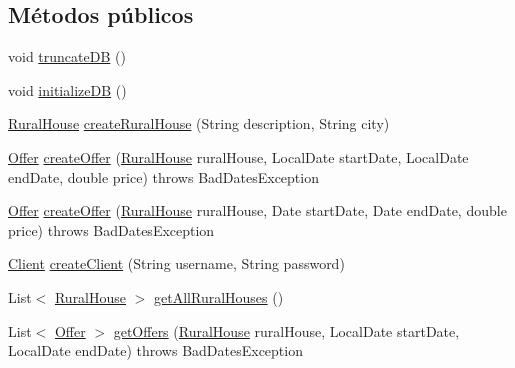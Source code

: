 \subsection*{Métodos públicos}
\begin{DoxyCompactItemize}
\item 
void \mbox{\hyperlink{interfacecom_1_1ruralhousejsf_1_1data_access_1_1_hibernate_data_access_interface_a181eb91e600e57fe36301128022f535d}{truncate\+DB}} ()
\item 
void \mbox{\hyperlink{interfacecom_1_1ruralhousejsf_1_1data_access_1_1_hibernate_data_access_interface_acab426a4933f3510c317816c136cec0b}{initialize\+DB}} ()
\item 
\mbox{\hyperlink{classcom_1_1ruralhousejsf_1_1domain_1_1_rural_house}{Rural\+House}} \mbox{\hyperlink{interfacecom_1_1ruralhousejsf_1_1data_access_1_1_hibernate_data_access_interface_a4c8bc4e3b076f4fc75efb878cc2c1c21}{create\+Rural\+House}} (String description, String city)
\item 
\mbox{\hyperlink{classcom_1_1ruralhousejsf_1_1domain_1_1_offer}{Offer}} \mbox{\hyperlink{interfacecom_1_1ruralhousejsf_1_1data_access_1_1_hibernate_data_access_interface_a0fe06262f78319a1fd4c2fd4e9534db8}{create\+Offer}} (\mbox{\hyperlink{classcom_1_1ruralhousejsf_1_1domain_1_1_rural_house}{Rural\+House}} rural\+House, Local\+Date start\+Date, Local\+Date end\+Date, double price)  throws Bad\+Dates\+Exception
\item 
\mbox{\hyperlink{classcom_1_1ruralhousejsf_1_1domain_1_1_offer}{Offer}} \mbox{\hyperlink{interfacecom_1_1ruralhousejsf_1_1data_access_1_1_hibernate_data_access_interface_a31f9cb8a3c8f0b42dee19b03f052cd62}{create\+Offer}} (\mbox{\hyperlink{classcom_1_1ruralhousejsf_1_1domain_1_1_rural_house}{Rural\+House}} rural\+House, Date start\+Date, Date end\+Date, double price)  throws Bad\+Dates\+Exception
\item 
\mbox{\hyperlink{classcom_1_1ruralhousejsf_1_1domain_1_1_client}{Client}} \mbox{\hyperlink{interfacecom_1_1ruralhousejsf_1_1data_access_1_1_hibernate_data_access_interface_a4671ad8ff75ef8a9195974dbdcd95e7f}{create\+Client}} (String username, String password)
\item 
List$<$ \mbox{\hyperlink{classcom_1_1ruralhousejsf_1_1domain_1_1_rural_house}{Rural\+House}} $>$ \mbox{\hyperlink{interfacecom_1_1ruralhousejsf_1_1data_access_1_1_hibernate_data_access_interface_a1cdfce6d8d91e481887b364000fbf6d0}{get\+All\+Rural\+Houses}} ()
\item 
List$<$ \mbox{\hyperlink{classcom_1_1ruralhousejsf_1_1domain_1_1_offer}{Offer}} $>$ \mbox{\hyperlink{interfacecom_1_1ruralhousejsf_1_1data_access_1_1_hibernate_data_access_interface_a731ab9e6ef26732d453046c9630c677b}{get\+Offers}} (\mbox{\hyperlink{classcom_1_1ruralhousejsf_1_1domain_1_1_rural_house}{Rural\+House}} rural\+House, Local\+Date start\+Date, Local\+Date end\+Date)  throws Bad\+Dates\+Exception

\end{DoxyCompactItemize}
